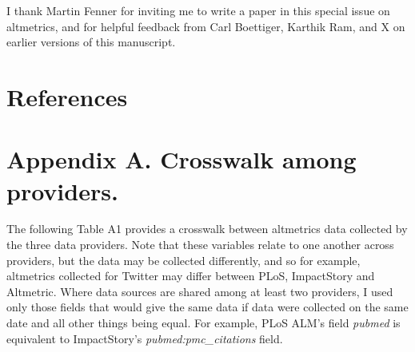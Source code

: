 \documentclass[letterpaper,superscriptaddress,showkeys,longbibliography]{revtex4-1}\usepackage{graphicx, color}
\begin{document}
I thank Martin Fenner for inviting me to write a paper in this special issue on altmetrics, and for helpful feedback from Carl Boettiger, Karthik Ram, and X on earlier versions of this manuscript.
  
\section*{References}


\section*{Appendix A. Crosswalk among providers.}

The following Table A1 provides a crosswalk between altmetrics data collected by the three data providers. Note that these variables relate to one another across providers, but the data may be collected differently, and so for example, altmetrics collected for Twitter may differ between PLoS, ImpactStory and Altmetric. Where data sources are shared among at least two providers, I used only those fields that would give the same data if data were collected on the same date and all other things being equal. For example, PLoS ALM's field \emph{pubmed} is equivalent to ImpactStory's \emph{pubmed:pmc\_citations} field.
\end{document}
